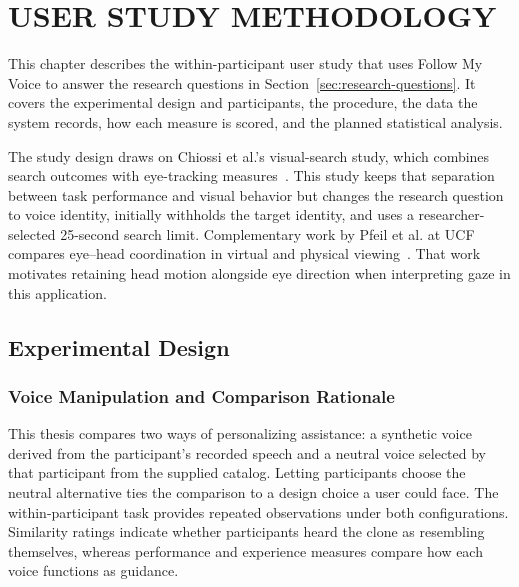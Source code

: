 \chapter{USER STUDY METHODOLOGY}
\label{ch:study}
This chapter describes the within-participant user study that uses Follow My Voice to answer the research questions in Section~\ref{sec:research-questions}. It covers the experimental design and participants, the procedure, the data the system records, how each measure is scored, and the planned statistical analysis.

The study design draws on Chiossi et al.'s visual-search study, which combines search outcomes with eye-tracking measures~\cite{chiossi2024searching}. This study keeps that separation between task performance and visual behavior but changes the research question to voice identity, initially withholds the target identity, and uses a researcher-selected 25-second search limit. Complementary work by Pfeil et al. at UCF compares eye--head coordination in virtual and physical viewing~\cite{pfeil2018eyehead}. That work motivates retaining head motion alongside eye direction when interpreting gaze in this application.

\section{Experimental Design}
\label{ch:methodology}
\subsection{Voice Manipulation and Comparison Rationale}
This thesis compares two ways of personalizing assistance: a synthetic voice derived from the participant's recorded speech and a neutral voice selected by that participant from the supplied catalog. Letting participants choose the neutral alternative ties the comparison to a design choice a user could face. The within-participant task provides repeated observations under both configurations. Similarity ratings indicate whether participants heard the clone as resembling themselves, whereas performance and experience measures compare how each voice functions as guidance.

